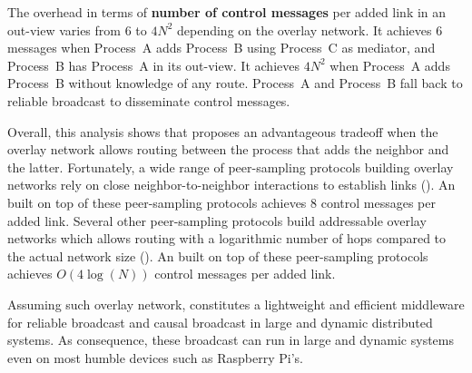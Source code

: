 \noindent The overhead in terms of \textbf{number of control messages} per added
link in an out-view varies from $6$ to $4N^2$ depending on the overlay
network. It achieves $6$ messages when Process~A adds Process~B using Process~C
as mediator, and Process~B has Process~A in its out-view. It achieves $4N^2$
when Process~A adds Process~B without knowledge of any route. Process~A and
Process~B fall back to reliable broadcast to disseminate control
messages. 

Overall, this analysis shows that \RPCBROADCAST proposes an advantageous
tradeoff when the overlay network allows routing between the process that adds
the neighbor and the latter. Fortunately, a wide range of peer-sampling
protocols building overlay networks rely on close neighbor-to-neighbor
interactions to establish links (\REF). An \RPCBROADCAST built on top of these
peer-sampling protocols achieves $8$ control messages per added link. Several
other peer-sampling protocols build addressable overlay networks which allows
routing with a logarithmic number of hops compared to the actual network size
(\REF). An \RPCBROADCAST built on top of these peer-sampling protocols achieves
$O(4\log(N))$ control messages per added link.

Assuming such overlay network, \RPCBROADCAST constitutes a lightweight and
efficient middleware for reliable broadcast and causal broadcast in large and
dynamic distributed systems. As consequence, these broadcast can run in large
and dynamic systems even on most humble devices such as Raspberry Pi's.



